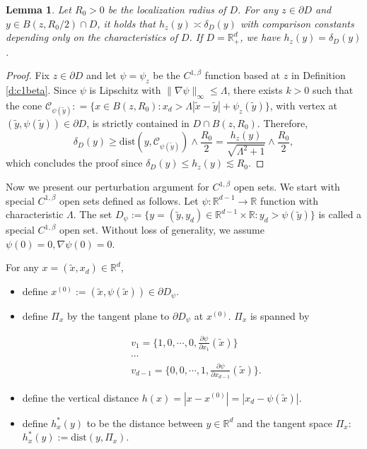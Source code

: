 \documentclass[12pt,a4paper]{amsart}
\numberwithin{equation}{section}
\theoremstyle{plain}
\newcommand{\mc}{\mathcal}
\newcommand{\mb}{\mathbb}
\newcommand{\wt}{\widetilde}
\newcommand{\ZR}{\mathbb{R}}
\newcommand{\R}{\mathbb{R}}
\newcommand{\1}{\mathbbm{1}}
\newtheorem{lemma}[theorem]{Lemma}
\begin{document}
\begin{lemma} \label{comparison: codimension 1}
Let $R_0>0$ be the localization radius of $D$. 
For any $z \in \partial D$ and $y \in B(z,R_0/2) \cap D$, 
it holds that  $h_z(y) \asymp \delta_D(y)$ with comparison constants depending only on the characteristics of $D$.
If $D = \ZR^d_+$, we have $h_z(y) = \delta_D(y)$.
\end{lemma}
\begin{proof}
Fix $z\in \partial D$ and let $\psi=\psi_z$ be the $C^{1, \beta}$ function based at $z$ in Definition \ref{d:c1beta}. 
Since $\psi$ is Lipschitz with $\|\nabla \psi\|_{\infty} \le \Lambda$, there exists 
$k>0$ such that the cone 
$\mc C_{\psi(\wt y)} : = \{x\in B(z,R_0): x_d >\Lambda |\wt x - \wt y| + \psi_z(\wt y)\}$, 
with vertex at $(\wt y, \psi(\wt y)) \in \partial D$, 
is strictly contained in $D \cap B(z,R_0)$. 
Therefore, 
$$
\delta_D(y) \ge \text{dist}(y, \mc C_{\psi(\wt y)}) \wedge \frac{R_0}{2}  = \frac{h_z(y)}{\sqrt{\Lambda^2 + 1 }} \wedge \frac{R_0}{2},
$$ 
which concludes the proof since $\delta_D(y) \le h_z(y) \lesssim R_0$.
\end{proof}

Now we present our perturbation argument for $C^{1,\beta}$ open sets.
We start with special $C^{1,\beta}$ open sets defined as follows. Let $\psi: \mb{R}^{d-1} \to \mb{R}$ function with
characteristic $\Lambda$. The set $D_{\psi} := \{y = (\wt{y}, y_d) \in \mb{R}^{d-1} \times \mb{R}: y_d > \psi(\wt{y})\}$
is called a special $C^{1,\beta}$ open set.
Without loss of generality, we assume $\psi(0)=0, \nabla \psi(0) = 0$. 

For any $x = (\wt x, x_d)\in\R^d$, 
\begin{itemize}
\item define 
$x^{(0)} := (\wt{x}, \psi(\wt{x})) \in \partial D_{\psi}$. 
\item define $\Pi_x$ by the tangent plane to $\partial D_{\psi}$ at 
$x^{(0)}$. $\Pi_x$ is spanned by 

\begin{equation}\label{def:tangent plane definition}
\begin{aligned}
& v_1 = \{1,0,\cdots, 0, \frac{\partial \psi}{\partial x_1}(\wt{x})\} \\
& \cdots \\
& v_{d-1} = \{0,0,\cdots, 1, \frac{\partial \psi}{\partial x_{d-1}}(\wt{x})\}.
\end{aligned}
\end{equation}

\item define the vertical distance 
$h(x) = |x-x^{(0)}| = |x_d - \psi(\wt x)|$.
\item define $h_x^*(y)$ to be the distance between $y \in \mb R^d$ and the tangent space $\Pi_x$: $h_x^*(y) := \text{dist}(y,\Pi_x)$.
\end{itemize}
\end{document}
